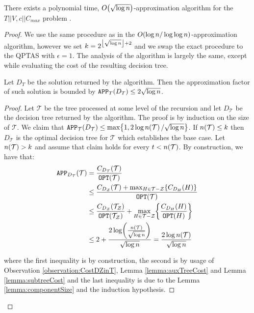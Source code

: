 \begin{theorem}
    There exists a polynomial time, $O\mathopen{}\left( \sqrt{\log n} \right)$-approximation algorithm for the $T||V,c||C_{max}$ problem .
    \begin{proof}
    We use the same procedure as in the $O\mathopen{}\left( \log n/\log\log n \right)$-approximation algorithm, however we set $k=2^{\mathopen{}\left\lfloor \sqrt{\log n} \right\rfloor+2}$ and we swap the exact procedure to the QPTAS with $\epsilon=1$. The analysis of the algorithm is largely the same, except while evaluating the cost of the resulting decision tree.
    \begin{lemma}
        Let $D_T$ be the solution returned by the algorithm. Then the approximation factor of such solution is bounded by 
    $
    \texttt{APP}_T\mathopen{}\left( D_T \right)\leq 2\sqrt{\log n}
    $.
    \begin{proof}
        Let $\mathcal{T}$ be the tree processed at some level of the recursion and let $D_{\mathcal{T}}$ be the decision tree returned by the algorithm. The proof is by induction on the size of $\mathcal{T}$.  We claim that $\texttt{APP}_{\mathcal{T}}\mathopen{}\left( D_{\mathcal{T}} \right)\leq \max\mathopen{}\left\{ 1, 2\log n\mathopen{}\left( \mathcal{T} \right)/\sqrt{\log n} \right\}$. If $n\mathopen{}\left( \mathcal{T} \right)\leq k$ then $D_{\mathcal{T}}$ is the optimal decision tree for $\mathcal{T}$ which establishes the base case. Let $n\mathopen{}\left( \mathcal{T} \right) > k$ and assume that claim holds for every $t< n\mathopen{}\left( \mathcal{T} \right)$. 
        By construction, we have that:
        \begin{align*}
        \texttt{APP}_{D_{\mathcal{T}}}\mathopen{}\left( \mathcal{T} \right)&=\frac{C_{D_{\mathcal{T}}}\mathopen{}\left( \mathcal{T} \right)}{\texttt{OPT}\mathopen{}\left( \mathcal{T} \right)}\\
        &\leq \frac{C_{D_{\mathcal{Z}}}\mathopen{}\left( \mathcal{T} \right)+\max_{H\in \mathcal{T}-\mathcal{Z}}\mathopen{}\left\{ C_{D_H}\mathopen{}\left( H \right) \right\}}{\texttt{OPT}\mathopen{}\left( \mathcal{T} \right)}\\
        &\leq \frac{C_{D_{\mathcal{Z}}}\mathopen{}\left( \mathcal{T}_{\mathcal{Z}} \right)}{\texttt{OPT}\mathopen{}\left( \mathcal{T}_{\mathcal{Z}} \right)}+\max_{H\in \mathcal{T}-\mathcal{Z}}\mathopen{}\left\{ \frac{C_{D_H}\mathopen{}\left( H \right)}{\texttt{OPT}\mathopen{}\left( H \right)} \right\}\\
        &\leq 2+\frac{2\log\mathopen{}\left( \frac{n\mathopen{}\left( \mathcal{T} \right)}{\sqrt{\log n}} \right)}{\sqrt{\log n}}= \frac{2\log n\mathopen{}\left( \mathcal{T} \right)}{\sqrt{\log n}}
        \end{align*}
        
        where the first inequality is by construction, the second is by usage of Observation \ref{observation:CostDZinT}, Lemma \ref{lemma:auxTreeCost} and Lemma \ref{lemma:subtreeCost} and the last inequality is due to the Lemma \ref{lemma:componentSize} and the induction hypothesis.
    \end{proof}
\end{lemma}
    \end{proof}
\end{theorem}
